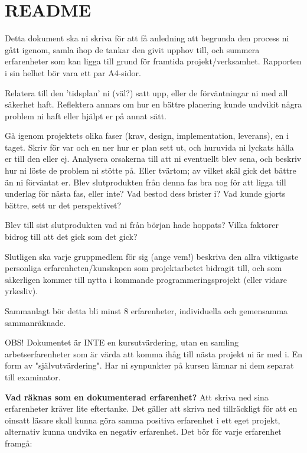 \section{README}
Detta dokument ska ni skriva för att få anledning att begrunda den process ni gått igenom, samla ihop de tankar den givit upphov till, och summera erfarenheter som kan ligga till grund för framtida projekt/verksamhet. Rapporten i sin helhet bör vara ett par A4-sidor.

Relatera till den 'tidsplan' ni (väl?) satt upp, eller de förväntningar ni med all säkerhet haft. Reflektera annars om hur en bättre planering kunde undvikit några problem ni haft eller hjälpt er på annat sätt.

Gå igenom projektets olika faser (krav, design, implementation, leverans), en i taget. Skriv för var och en ner hur er plan sett ut, och huruvida ni lyckats hålla er till den eller ej. Analysera orsakerna till att ni eventuellt blev sena, och beskriv hur ni löste de problem ni stötte på. Eller tvärtom; av vilket skäl gick det bättre än ni förväntat er. Blev slutprodukten från denna fas bra nog för att ligga till underlag för nästa fas, eller inte? Vad bestod dess brister i? Vad kunde gjorts bättre, sett ur det perspektivet?

Blev till sist slutprodukten vad ni från början hade hoppats? Vilka faktorer bidrog till att det gick som det gick?

Slutligen ska varje gruppmedlem för sig (ange vem!) beskriva den allra viktigaste personliga erfarenheten/kunskapen som projektarbetet bidragit till, och som säkerligen kommer till nytta i kommande programmeringsprojekt (eller vidare yrkesliv).

Sammanlagt bör detta bli minst 8 erfarenheter, individuella och
gemensamma sammanräknade.

OBS! Dokumentet är INTE en kursutvärdering, utan en samling
arbetserfarenheter som är värda att komma ihåg till nästa projekt ni
är med i.  En form av "självutvärdering". Har ni synpunkter på kursen
lämnar ni dem separat till examinator.

\textbf{Vad räknas som en dokumenterad erfarenhet?}  Att skriva ned
sina erfarenheter kräver lite eftertanke. Det gäller att skriva ned
tillräckligt för att en oinsatt läsare skall kunna göra samma positiva
erfarenhet i ett eget projekt, alternativ kunna undvika en negativ
erfarenhet. Det bör för varje erfarenhet framgå:

